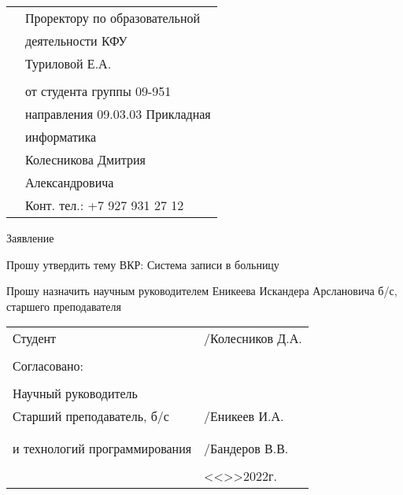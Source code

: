 \documentclass[a4paper]{article}
\begin{document}
    \begin{titlepage}
        \begin{xltabular}{\textwidth} {
                >{\hsize} X
                >{\hsize} X }
            & Проректору по образовательной \\
            & деятельности КФУ \\
            & Туриловой Е.А. \\
            & \\
            & от студента группы 09-951 \\
            & направления 09.03.03 Прикладная \\
            & информатика \\
            & Колесникова Дмитрия \\
            & Александровича \\
            & Конт. тел.: +7 927 931 27 12 \\
        \end{xltabular}

        \begin{center}
            Заявление
        \end{center}

        \begin{flushleft}
            Прошу утвердить тему ВКР: Система записи в больницу \\
        \end{flushleft}

        \begin{flushleft}
            Прошу назначить научным руководителем Еникеева Искандера Арслановича б/с, старшего преподавателя
        \end{flushleft}

        \vfill

        \begin{xltabular}{\textwidth} {
                >{\hsize} X
                >{\hsize} X }
            Студент & \underline{\hspace{3cm}}/Колесников Д.А. \\
            & \\
            Согласовано: & \\
            & \\
            Научный руководитель & \\
            Старший преподаватель, б/с & \underline{\hspace{3cm}}/Еникеев И.А. \\
            & \\
             \\
            и технологий программирования & \underline{\hspace{3cm}}/Бандеров В.В. \\
            & \\
            & <<\underline{\hspace{1cm}}>>\underline{\hspace{3cm}}2022г. \\
        \end{xltabular}
    \end{titlepage}
\end{document}
